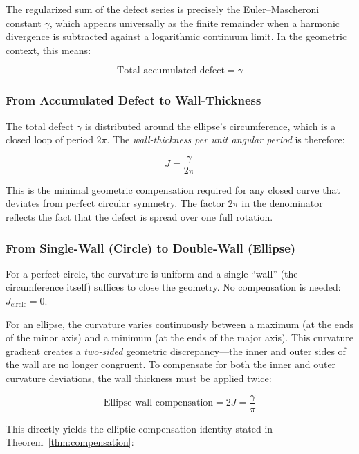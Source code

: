 \documentclass[11pt,a4paper]{article}
\theoremstyle{definition}
\begin{document}
The regularized sum of the defect series is precisely the Euler--Mascheroni constant \(\gamma\), which appears universally as the finite remainder when a harmonic divergence is subtracted against a logarithmic continuum limit. In the geometric context, this means:

\begin{equation}
\text{Total accumulated defect} = \gamma
\end{equation}

\subsubsection*{From Accumulated Defect to Wall-Thickness}
The total defect \(\gamma\) is distributed around the ellipse's circumference, which is a closed loop of period \(2\pi\). The \emph{wall-thickness per unit angular period} is therefore:

\begin{equation}
J = \frac{\gamma}{2\pi}
\end{equation}

This is the minimal geometric compensation required for any closed curve that deviates from perfect circular symmetry. The factor \(2\pi\) in the denominator reflects the fact that the defect is spread over one full rotation.

\subsubsection*{From Single-Wall (Circle) to Double-Wall (Ellipse)}
For a perfect circle, the curvature is uniform and a single ``wall'' (the circumference itself) suffices to close the geometry. No compensation is needed: \(J_{\text{circle}} = 0\).

For an ellipse, the curvature varies continuously between a maximum (at the ends of the minor axis) and a minimum (at the ends of the major axis). This curvature gradient creates a \emph{two-sided} geometric discrepancy---the inner and outer sides of the wall are no longer congruent. To compensate for both the inner and outer curvature deviations, the wall thickness must be applied twice:

\begin{equation}
\text{Ellipse wall compensation} = 2J = \frac{\gamma}{\pi}
\end{equation}

This directly yields the elliptic compensation identity stated in Theorem~\ref{thm:compensation}:
\end{document}
